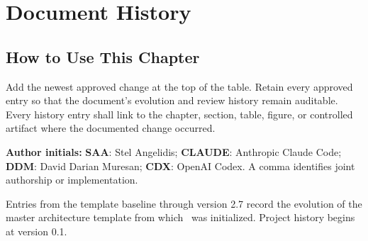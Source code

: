 \chapter*{Document History}
\section*{How to Use This Chapter}
Add the newest approved change at the top of the table. Retain every approved
entry so that the document's evolution and review history remain auditable.
Every history entry shall link to the chapter, section, table, figure, or
controlled artifact where the documented change occurred.

\noindent\textbf{Author initials:} \textbf{SAA}: Stel Angelidis;
\textbf{CLAUDE}: Anthropic Claude Code; \textbf{DDM}: David Darian Muresan;
\textbf{CDX}: OpenAI Codex. A comma identifies joint authorship or implementation.

\noindent Entries from the template baseline through version 2.7 record the
evolution of the master architecture template from which \ProjectName\ was
initialized. Project history begins at version 0.1.

